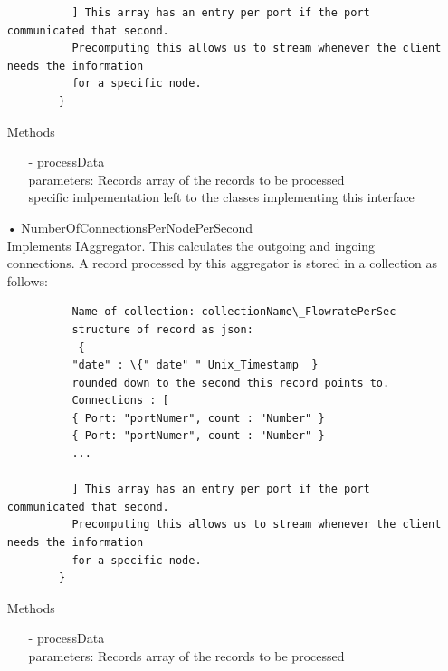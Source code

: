 \documentclass[oneside, english, final]{design}
\begin{document}
\begin{itemize}
\begin{verbatim}
		  ] This array has an entry per port if the port communicated that second. 
		  Precomputing this allows us to stream whenever the client needs the information 
		  for a specific node.
		}
	      \end{verbatim}
	      Methods
	      \begin{itemize}
		      \item[-]processData
		            \\parameters: Records array of the records to be processed
		            \\ specific imlpementation left to the classes implementing this interface
	      \end{itemize}

	\item[•] NumberOfConnectionsPerNodePerSecond
	      \\Implements IAggregator. This calculates the outgoing and ingoing connections.
	      A record processed by this aggregator is stored in a collection as follows:
	      \begin{verbatim} 
		  Name of collection: collectionName\_FlowratePerSec
		  structure of record as json:
		   {
		  "date" : \{" date" " Unix_Timestamp  } 
		  rounded down to the second this record points to.
		  Connections : [
		  { Port: "portNumer", count : "Number" }
		  { Port: "portNumer", count : "Number" }
		  ...
		  
		  ] This array has an entry per port if the port communicated that second. 
		  Precomputing this allows us to stream whenever the client needs the information 
		  for a specific node.
		}
	      \end{verbatim}
	      Methods
	      \begin{itemize}
		      \item[-]processData
		            \\parameters: Records array of the records to be processed
	      \end{itemize}


\end{itemize}
\end{document}
